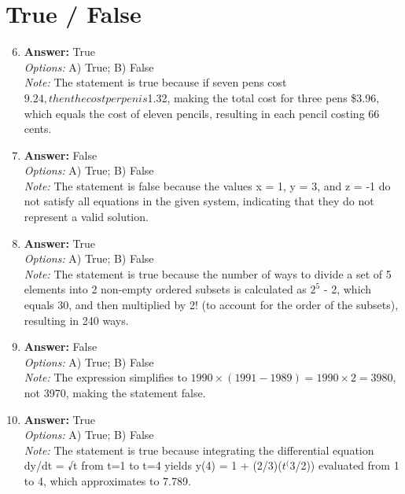 \documentclass[12pt]{article}
\begin{document}
\section*{True / False}
\begin{enumerate}[label=\arabic*.]
\setcounter{enumi}{5}
\item \textbf{Answer:} True
\\ \textit{Options:} A) True; B) False
\\ \textit{Note:} The statement is true because if seven pens cost $9.24, then the cost per pen is $1.32, making the total cost for three pens \$3.96, which equals the cost of eleven pencils, resulting in each pencil costing 66 cents.
\item \textbf{Answer:} False
\\ \textit{Options:} A) True; B) False
\\ \textit{Note:} The statement is false because the values x = 1, y = 3, and z = -1 do not satisfy all equations in the given system, indicating that they do not represent a valid solution.
\item \textbf{Answer:} True
\\ \textit{Options:} A) True; B) False
\\ \textit{Note:} The statement is true because the number of ways to divide a set of 5 elements into 2 non-empty ordered subsets is calculated as $2^5$ - 2, which equals 30, and then multiplied by 2! (to account for the order of the subsets), resulting in 240 ways.
\item \textbf{Answer:} False
\\ \textit{Options:} A) True; B) False
\\ \textit{Note:} The expression simplifies to \(1990 \times (1991 - 1989) = 1990 \times 2 = 3980\), not 3970, making the statement false.
\item \textbf{Answer:} True
\\ \textit{Options:} A) True; B) False
\\ \textit{Note:} The statement is true because integrating the differential equation dy/dt = √t from t=1 to t=4 yields y(4) = 1 + (2/3)($t^(3$/2)) evaluated from 1 to 4, which approximates to 7.789.
\end{enumerate}
\end{document}
